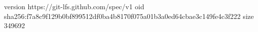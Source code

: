 version https://git-lfs.github.com/spec/v1
oid sha256:f7a8c9f129b0bf899512df0ba4b8170f075a01b3a0ed64cbae3c149fe4c3f222
size 349692
